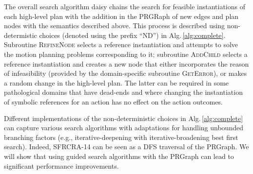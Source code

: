 The overall search algorithm daisy chains the search for feasible
instantiations of each high-level plan with the addition in the
PRGRaph of new edges and plan nodes with the semantics described
above. This process is described using non-determistic choices
(denoted using the prefix ``ND'') in
Alg.\,\ref{alg:complete}. Subroutine \textsc{RefineNode} selects a
reference instantiation and attempts to solve the motion planning
problems corresponding to it; subroutine \textsc{AddChild} selects a
reference instantiation and creates a new node that either
incorporates the reason of infeasibility (provided by the
domain-specific subroutine \textsc{GetError}), or makes a random
change in the high-level plan. The latter can be required in some
pathological domains that have dead-ends and where changing the
instantiation of symbolic references for an action has no effect on the
action outcomes.

Different implementations of the non-deterministic choices in
Alg.\,\ref{alg:complete} can capture various search algorithms
with adaptations for handling unbounded branching factors (e.g.,
iterative-deepening with iterative-broadening best first
search). Indeed, SFRCRA-14 can be seen as a DFS traversal of the
PRGraph. We will show that using guided search algorithms with the
PRGraph can lead to significant performance improvements.

